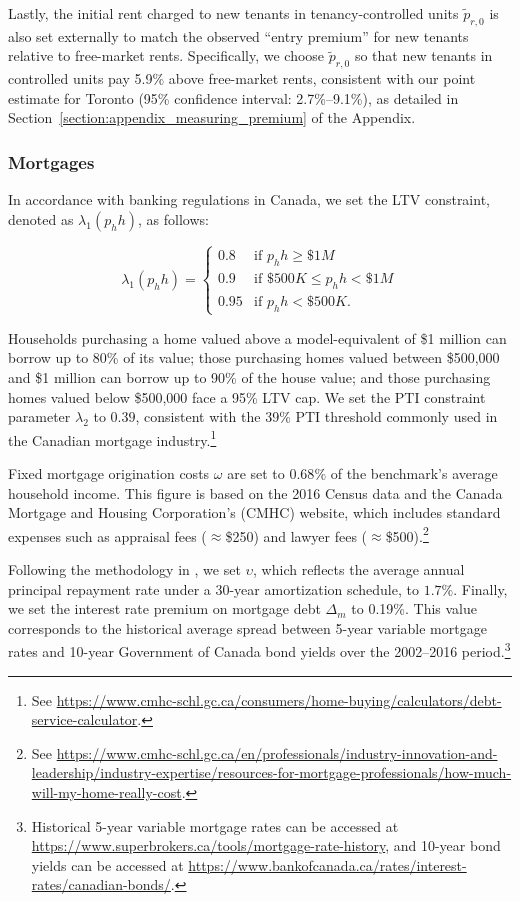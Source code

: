 \documentclass[parskip=full]{article}
\begin{document}
Lastly, the initial rent charged to new tenants in tenancy-controlled units $\tilde{p}_{r,0}$ is also set externally to match the observed ``entry premium'' for new tenants relative to free-market rents. Specifically, we choose $\tilde{p}_{r,0}$ so that new tenants in controlled units pay 5.9\% above free-market rents, consistent with our point estimate for Toronto (95\% confidence interval: 2.7\%–9.1\%), as detailed in Section~\ref{section:appendix_measuring_premium} of the Appendix.

\subsubsection{Mortgages}

In accordance with banking regulations in Canada, we set the LTV constraint, denoted as $\lambda_{1}(p_h h)$, as follows:

\begin{equation*}
\lambda_{1}(p_h h) = 
\begin{cases}
0.8 &\text{if } p_h h\geq \$1M\\
0.9 &\text{if } \$500K\leq p_h h< \$1M\\
0.95 &\text{if } p_h h < \$500K.
\end{cases}
\end{equation*}

\noindent Households purchasing a home valued above a model-equivalent of \$1 million can borrow up to 80\% of its value; those purchasing homes valued between \$500,000 and \$1 million can borrow up to 90\% of the house value; and those purchasing homes valued below \$500,000 face a 95\% LTV cap. We set the PTI constraint parameter $\lambda_{2}$ to $0.39$, consistent with the 39\% PTI threshold commonly used in the Canadian mortgage industry.\footnote{See \url{https://www.cmhc-schl.gc.ca/consumers/home-buying/calculators/debt-service-calculator}.}

Fixed mortgage origination costs $\omega$ are set to $0.68\%$ of the benchmark's average household income. This figure is based on the 2016 Census data and the Canada Mortgage and Housing Corporation's (CMHC) website, which includes standard expenses such as appraisal fees ($\approx$\$250) and lawyer fees ($\approx$\$500).\footnote{See \url{https://www.cmhc-schl.gc.ca/en/professionals/industry-innovation-and-leadership/industry-expertise/resources-for-mortgage-professionals/how-much-will-my-home-really-cost}.}

Following the methodology in \citet{kkk-2021}, we set $\upsilon$, which reflects the average annual principal repayment rate under a 30-year amortization schedule, to $1.7\%$. Finally, we set the interest rate premium on mortgage debt $\Delta_{m}$ to 0.19\%. This value corresponds to the historical average spread between 5-year variable mortgage rates and 10-year Government of Canada bond yields over the 2002--2016 period.\footnote{Historical 5-year variable mortgage rates can be accessed at \url{https://www.superbrokers.ca/tools/mortgage-rate-history}, and 10-year bond yields can be accessed at \url{https://www.bankofcanada.ca/rates/interest-rates/canadian-bonds/}.}
\end{document}

